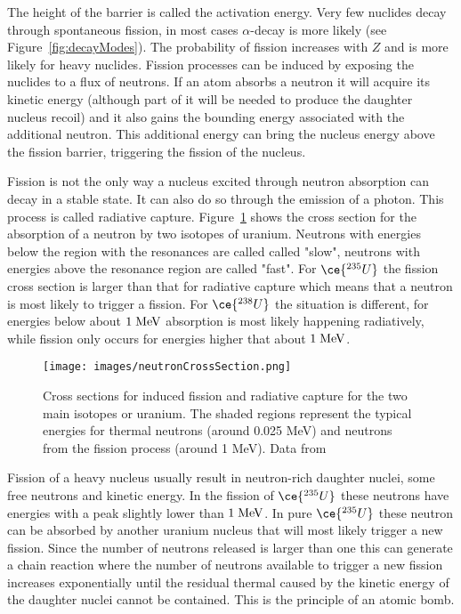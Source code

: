 \documentclass[12pt]{article}
\begin{document}
The height of the barrier is called the activation energy. Very few nuclides decay through spontaneous fission, in most cases $\alpha$-decay is more likely (see Figure~\ref{fig:decayModes}). The probability of fission increases with $Z$ and is more likely for heavy nuclides. Fission processes can be induced by exposing the nuclides to a flux of neutrons. If an atom absorbs a neutron it will acquire its kinetic energy (although part of it will be needed to produce the daughter nucleus recoil) and it also gains the bounding energy associated with the additional neutron. This additional energy can bring the nucleus energy above the fission barrier, triggering the fission of the nucleus. 

Fission is not the only way a nucleus excited through neutron absorption can decay in a stable state. It can also do so through the emission of a photon. This process is called radiative capture. Figure~\ref{fig:neutronCrossSection} shows the cross section for the absorption of a neutron by two isotopes of uranium. Neutrons with energies below the region with the resonances are called called "slow", neutrons with energies above the resonance region are called "fast". For $\ce{^{235}U}$ the fission cross section is larger than that for radiative capture which means that a neutron is most likely to trigger a fission. For $\ce{^{238}U}$ the situation is different, for energies below about $1\;\rm{MeV}$ absorption is most likely happening radiatively, while fission only occurs for energies higher that about $1\;\rm{MeV}$.

\begin{figure}
\begin{center}
\texttt{[image: images/neutronCrossSection.png]}   
\end{center}
\caption{Cross sections for induced fission and radiative capture for the two main isotopes or uranium. The shaded regions represent the typical energies for thermal neutrons (around 0.025 MeV) and neutrons from the fission process (around 1 MeV). Data from \cite{nds}}\label{fig:neutronCrossSection}
\end{figure} 
Fission of a heavy nucleus usually result in neutron-rich daughter nuclei, some free neutrons and kinetic energy. In the fission of $\ce{^{235}U}$ these neutrons have energies with a peak slightly lower than $1\;\rm{MeV}$. In pure $\ce{^{235}U}$ these neutron can be absorbed by another uranium nucleus that will most likely trigger a new fission. Since the number of neutrons released is larger than one this can generate a chain reaction where the number of neutrons available to trigger a new fission increases exponentially until the residual thermal caused by the kinetic energy of the daughter nuclei cannot be contained. This is the principle of an atomic bomb. 
\end{document}
